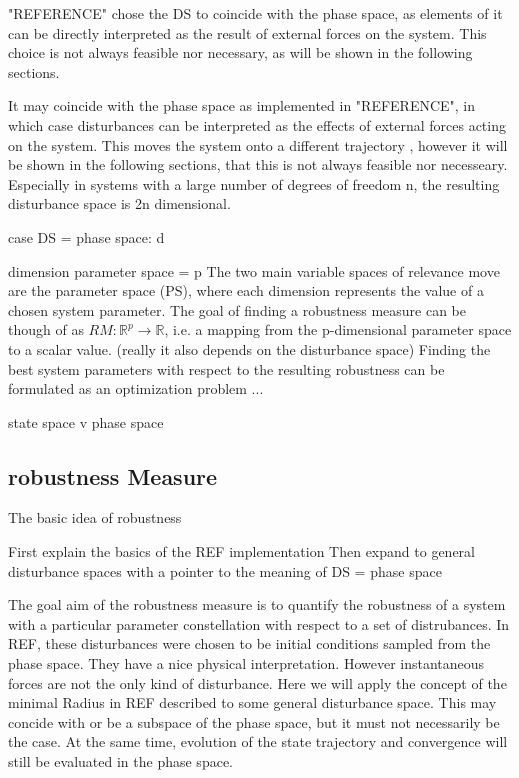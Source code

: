     "REFERENCE" chose the DS to coincide with the phase space, as elements of it can be directly interpreted as the result of external forces on the system. This choice is not always feasible nor necessary, as will be shown in the following sections. 

    It may coincide with the phase space as implemented in "REFERENCE", in which case disturbances can be interpreted as the effects of external forces acting on the system. This moves the system onto a different trajectory 
    , however it will be shown in the following sections, that this is not always feasible nor necesseary. Especially in systems with a large number of degrees of freedom n, the resulting disturbance space is 2n dimensional. 

    case DS = phase space: d

    dimension parameter space = p
    The two main variable spaces of relevance move are the parameter space (PS), where each dimension represents the value of a chosen system parameter. The goal of finding a robustness measure can be though of as $RM:\mathbb{R}^p \rightarrow \mathbb{R}$, i.e. a mapping from the p-dimensional parameter space to a scalar value. (really it also depends on the disturbance space) Finding the best system parameters with respect to the resulting robustness can be formulated as an optimization problem ...


    
    state space v phase space

\subsection{robustness Measure}

    The basic idea of robustness 

    First explain the basics of the REF implementation
    Then expand to general disturbance spaces with a pointer to the meaning of DS = phase space

    
    The goal aim of the robustness measure is to quantify the robustness of a system with a particular parameter constellation with respect to a set of distrubances. 
    In REF, these disturbances were chosen to be initial conditions sampled from the phase space. They have a nice physical interpretation. However instantaneous forces are not the only kind of disturbance. Here we will apply the concept of the minimal Radius in REF described to some general disturbance space. This may concide with or be a subspace of the phase space, but it must not necessarily be the case. At the same time, evolution of the state trajectory and convergence will still be evaluated in the phase space. 


